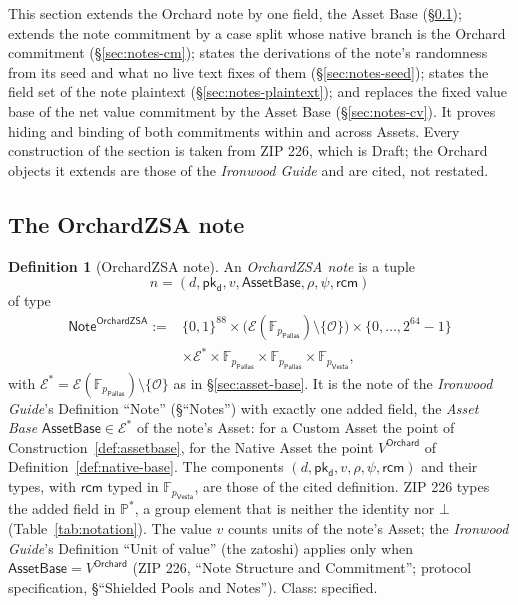 \documentclass[11pt,a4paper]{article}
\theoremstyle{definition}
\newtheorem{definition}[theorem]{Definition}
\newcommand{\F}{\mathbb{F}}
\newcommand{\PP}{\mathbb{P}}
\newcommand{\Pallas}{\ensuremath{\mathsf{Pallas}}}
\newcommand{\Vesta}{\ensuremath{\mathsf{Vesta}}}
\newcommand{\Ep}{\ensuremath{\mathcal{E}}}
\newcommand{\pkd}{\ensuremath{\mathsf{pk_d}}}
\newcommand{\rcm}{\ensuremath{\mathsf{rcm}}}
\begin{document}
This section extends the Orchard note by one field, the Asset Base
(\S\ref{sec:notes-note}); extends the note commitment by a case split whose
native branch is the Orchard commitment (\S\ref{sec:notes-cm}); states the
derivations of the note's randomness from its seed and what no live text
fixes of them (\S\ref{sec:notes-seed}); states the field set of the note
plaintext (\S\ref{sec:notes-plaintext}); and replaces the fixed value base of
the net value commitment by the Asset Base (\S\ref{sec:notes-cv}). It proves
hiding and binding of both commitments within and across Assets. Every
construction of the section is taken from ZIP 226, which is Draft; the
Orchard objects it extends are those of the \emph{Ironwood Guide} and are
cited, not restated.

\subsection{The OrchardZSA note}\label{sec:notes-note}

\begin{definition}[OrchardZSA note]\label{def:zsa-note}
An \emph{OrchardZSA note} is a tuple
\[
  n = (d, \pkd, v, \mathsf{AssetBase}, \rho, \psi, \rcm)
\]
of type
\begin{align*}
  \mathsf{Note}^{\mathsf{OrchardZSA}} := {}&
    \{0,1\}^{88} \times \bigl(\Ep(\F_{p_{\Pallas}}) \setminus
    \{\mathcal{O}\}\bigr) \times \{0, \dots, 2^{64} - 1\} \\
  &\times \Ep^{*} \times \F_{p_{\Pallas}} \times \F_{p_{\Pallas}}
    \times \F_{p_{\Vesta}},
\end{align*}
with $\Ep^{*} = \Ep(\F_{p_{\Pallas}}) \setminus \{\mathcal{O}\}$ as in
\S\ref{sec:asset-base}. It is the note of the \emph{Ironwood Guide}'s
Definition ``Note'' (\S``Notes'') with exactly one added field, the
\emph{Asset Base} $\mathsf{AssetBase} \in \Ep^{*}$ of the note's Asset:
for a Custom Asset the point of Construction~\ref{def:assetbase}, for the
Native Asset the point $V^{\mathsf{Orchard}}$ of
Definition~\ref{def:native-base}. The components
$(d, \pkd, v, \rho, \psi, \rcm)$ and their types, with $\rcm$ typed in
$\F_{p_{\Vesta}}$, are those of the cited definition. ZIP 226 types the
added field in $\PP^{*}$, a group element that is neither the identity nor
$\bot$ (Table~\ref{tab:notation}). The value $v$ counts units of the note's
Asset; the \emph{Ironwood Guide}'s Definition ``Unit of value'' (the
zatoshi) applies only when $\mathsf{AssetBase} = V^{\mathsf{Orchard}}$ (ZIP
226, ``Note Structure and Commitment''; protocol specification,
\S``Shielded Pools and Notes''). Class: specified.
\end{definition}
\end{document}

